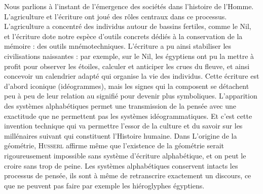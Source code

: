 \documentclass[a4paper,12pt]{report}
\begin{document}
Nous parlions à l'instant de l'émergence des sociétés dans l'histoire de l'Homme. L'agriculture et l'écriture ont joué des rôles centraux dans ce processus. L'agriculture a concentré des individus autour de bassins fertiles, comme le Nil, et l'écriture dote notre espèce d'outils concrets dédiés à la conservation de la mémoire : des outils mnémotechniques. L'écriture a pu ainsi stabiliser les civilisations naissantes : par exemple, sur le Nil, les égyptiens ont pu la mettre à profit pour observer les étoiles, calculer et anticiper les crues du fleuve, et ainsi concevoir un calendrier adapté qui organise la vie des individus. Cette écriture est d'abord iconique (idéogrammes), mais les signes qui la composent se détachent peu à peu de leur relation au signifié pour devenir plus symboliques. L'apparition des systèmes alphabétiques permet une transmission de la pensée avec une exactitude que ne permettent pas les systèmes idéogrammatiques. Et c'est cette invention technique qui va permettre l'essor de la culture et du savoir sur les millénaires suivant qui constituent l'Histoire humaine. Dans L'origine de la géométrie, \textsc{Husserl} affirme même que l'existence de la géométrie serait rigoureusement impossible sans système d'écriture alphabétique, et on peut le croire sans trop de peine. Les systèmes alphabétiques conservent intacts les processus de pensée, ils sont à même de retranscrire exactement un discours, ce que ne peuvent pas faire par exemple les hiéroglyphes égyptiens.
\end{document}
